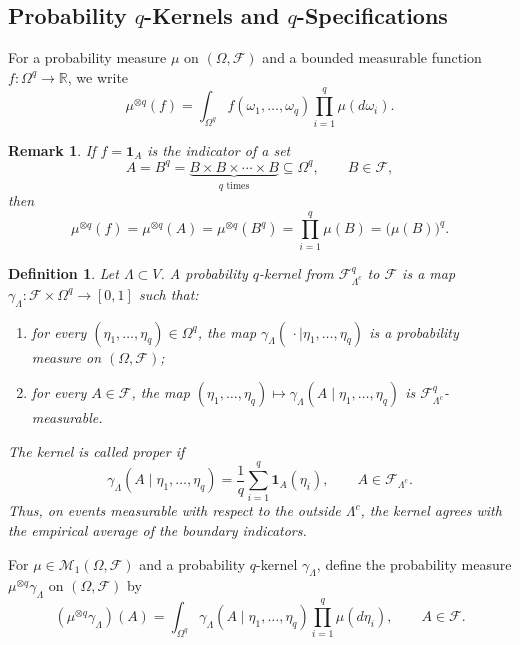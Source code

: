 \documentclass[11pt,reqno]{amsart}
\newtheorem{defn}{Definition}
\newtheorem{rk}{Remark}
\numberwithin{equation}{section} \setcounter{tocdepth}{1}
\begin{document}
\subsection{Probability $q$-Kernels and $q$-Specifications}

For a probability measure $\mu$ on $(\Omega,\mathcal F)$ and a bounded
measurable function $f:\Omega^q\to\mathbb R$, we write
\begin{equation}\label{fm}
	\mu^{\otimes q}(f)
	=
	\int_{\Omega^q}
	f(\omega_1,\ldots,\omega_q)
	\prod_{i=1}^q \mu(d\omega_i).
\end{equation}

\begin{rk}\label{xf}
	If $f=\mathbf 1_A$ is the indicator of a set
	\[
	A=B^q
	=
	\underbrace{B\times B\times\cdots\times B}_{q\text{ times}}
	\subseteq\Omega^q,
	\qquad B\in\mathcal F,
	\]
	then
	\[
	\mu^{\otimes q}(f)
	=
	\mu^{\otimes q}(A)
	=
	\mu^{\otimes q}(B^q)
	=
	\prod_{i=1}^q\mu(B)
	=
	\bigl(\mu(B)\bigr)^q.
	\]
\end{rk}

\begin{defn}
	Let $\Lambda\subset V$. A \textit{probability $q$-kernel} from
	$\mathcal F_{\Lambda^c}^q$ to $\mathcal F$ is a map $
	\gamma_\Lambda:\mathcal F\times\Omega^q\longrightarrow[0,1]$
	such that:
	\begin{enumerate}
		\item[(i)] for every
		$(\eta_1,\ldots,\eta_q)\in\Omega^q$, the map
		$
		\gamma_\Lambda(\,\cdot\mid\eta_1,\ldots,\eta_q)
		$
		is a probability measure on $(\Omega,\mathcal F)$;
		
		\item[(ii)] for every $A\in\mathcal F$, the map $
		(\eta_1,\ldots,\eta_q)
		\longmapsto
		\gamma_\Lambda(A\mid\eta_1,\ldots,\eta_q)
		$
		is $\mathcal F_{\Lambda^c}^q$-measurable.
	\end{enumerate}
	
	The kernel is called \textit{proper} if
	\begin{equation}\label{proper}
		\gamma_\Lambda(A\mid\eta_1,\ldots,\eta_q)
		=
		\frac{1}{q}\sum_{i=1}^q
		\mathbf 1_A(\eta_i),
		\qquad
		A\in\mathcal F_{\Lambda^c}.
	\end{equation}
	Thus, on events measurable with respect to the outside
	$\Lambda^c$, the kernel agrees with the empirical average of the
	boundary indicators.
\end{defn}

For $\mu\in\mathcal M_1(\Omega,\mathcal F)$ and a probability
$q$-kernel $\gamma_\Lambda$, define the probability measure
$\mu^{\otimes q}\gamma_\Lambda$ on $(\Omega,\mathcal F)$ by
\begin{equation}\label{mugamma}
	(\mu^{\otimes q}\gamma_\Lambda)(A)
	=
	\int_{\Omega^q}
	\gamma_\Lambda(A\mid\eta_1,\ldots,\eta_q)
	\prod_{i=1}^q\mu(d\eta_i),
	\qquad
	A\in\mathcal F.
\end{equation}
\end{document}
